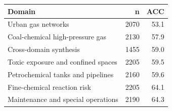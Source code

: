 \begin{tabular}{lrr}
\toprule
Domain & n & ACC \\
\midrule
Urban gas networks & 2070 & 53.1 \\
Coal-chemical high-pressure gas & 2130 & 57.9 \\
Cross-domain synthesis & 1455 & 59.0 \\
Toxic exposure and confined spaces & 2205 & 59.5 \\
Petrochemical tanks and pipelines & 2160 & 59.6 \\
Fine-chemical reaction risk & 2205 & 64.1 \\
Maintenance and special operations & 2190 & 64.3 \\
\bottomrule
\end{tabular}
